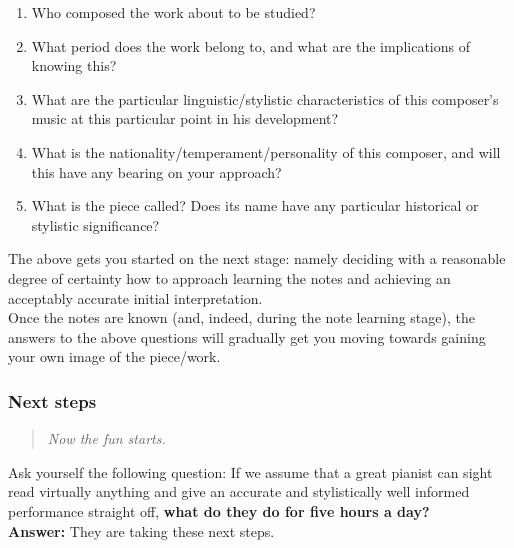 \documentclass{article}
\begin{document}
\begin{enumerate}
    \item Who composed the work about to be studied?\footnotemark


    \item What period does the work belong to, and what are the implications of knowing this?
    \item What are the particular linguistic/stylistic characteristics of this composer’s music at this particular point in his development?
    \item What is the nationality/temperament/personality of this composer, and will this have any bearing on your approach?
    \item What is the piece called?
        Does its name have any particular historical or stylistic significance?
\end{enumerate}

The above gets you started on the next stage: namely deciding with a reasonable degree of certainty how to approach learning the notes and achieving an acceptably accurate initial interpretation.\\

Once the notes are known (and, indeed, during the note learning stage), the answers to the above questions will gradually get you moving towards gaining your own image of the piece/work.

\subsubsection{Next steps}

\begin{quote}
    \textit{Now the fun starts.}
\end{quote}

Ask yourself the following question: If we assume that a great pianist can sight read virtually anything and give an accurate and stylistically well informed performance straight off, \textbf{what do they do for five hours a day?}\\

\textbf{Answer:}
They are taking these next steps.\footnotemark
\end{document}

